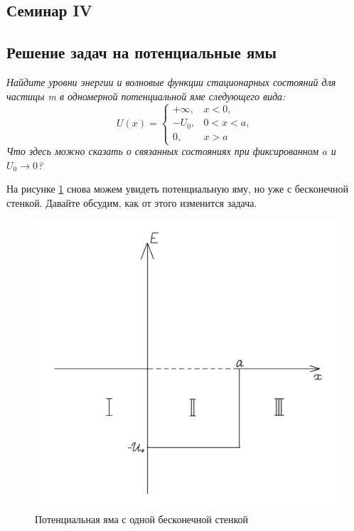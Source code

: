 \begin{center}
    \section{Семинар IV}
\end{center}
\subsection{Решение задач на потенциальные ямы}
\begin{center}
    \textit{Найдите уровни энергии и волновые функции стационарных состояний для частицы m в одномерной потенциальной яме следующего вида:}
    \[
    U(x) =
    \begin{cases}
    +\infty,& x<0,\\
    -U_0,& 0<x<a,\\
    0,& x>a
    \end{cases}
    \]
    \textit{Что здесь можно сказать о связанных состояниях при фиксированном $a$ и $U_0 \rightarrow 0$?}
\end{center}
На рисунке \ref{fig 4.1} снова можем увидеть потенциальную яму, но уже с бесконечной стенкой. Давайте обсудим, как от этого изменится задача.
\begin{figure}[h!]
\centering
\includegraphics[scale=0.27]{class 4/images/half-inf hole.png}
\caption{Потенциальная яма с одной бесконечной стенкой}
\label{fig 4.1}
\end{figure}\\
